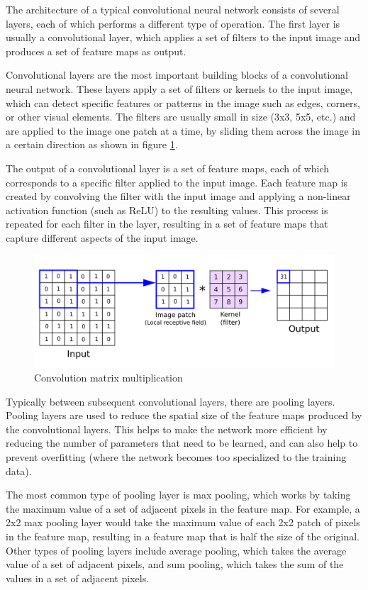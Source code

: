The architecture of a typical convolutional neural network consists of several layers, each of which performs a different type of operation. The first layer is usually a convolutional layer, which applies a set of filters to the input image and produces a set of feature maps as output.

Convolutional layers are the most important building blocks of a convolutional neural network. These layers apply a set of filters or kernels to the input image, which can detect specific features or patterns in the image such as edges, corners, or other visual elements. The filters are usually small in size (3x3, 5x5, etc.) and are applied to the image one patch at a time, by sliding them across the image in a certain direction as shown in figure \ref{fnd:convolution}.

The output of a convolutional layer is a set of feature maps, each of which corresponds to a specific filter applied to the input image. Each feature map is created by convolving the filter with the input image and applying a non-linear activation function (such as ReLU) to the resulting values. This process is repeated for each filter in the layer, resulting in a set of feature maps that capture different aspects of the input image.

\begin{figure}[H]
        \centering
        \includegraphics[width=120mm]{figures/convolution.png}
        \caption{Convolution matrix multiplication \cite{reynolds_anh_nodate}}
        \label{fnd:convolution}
\end{figure}

 Typically between subsequent convolutional layers, there are pooling layers. Pooling layers are used to reduce the spatial size of the feature maps produced by the convolutional layers. This helps to make the network more efficient by reducing the number of parameters that need to be learned, and can also help to prevent overfitting (where the network becomes too specialized to the training data).

The most common type of pooling layer is max pooling, which works by taking the maximum value of a set of adjacent pixels in the feature map. For example, a 2x2 max pooling layer would take the maximum value of each 2x2 patch of pixels in the feature map, resulting in a feature map that is half the size of the original. Other types of pooling layers include average pooling, which takes the average value of a set of adjacent pixels, and sum pooling, which takes the sum of the values in a set of adjacent pixels.

